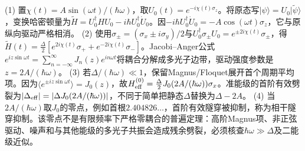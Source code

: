 (1) 置\(\chi(t)=A\sin(\omega t)/(\hbar\omega)\)，取\(U_0(t)=e^{-i\chi(t)\sigma_z}\)。将原态写\(|\psi\rangle=U_0|\widetilde\psi\rangle\)，变换哈密顿量为\(\widetilde H=U_0^\dagger HU_0-i\hbar U_0^\dagger\dot U_0\)。因\(-i\hbar U_0^\dagger\dot U_0=-A\cos(\omega t)\sigma_z\)，它与原纵向驱动严格相消。
(2) 使用\(\sigma_\pm=(\sigma_x\pm i\sigma_y)/2\)与\(U_0^\dagger\sigma_\pm U_0=e^{\pm 2i\chi(t)}\sigma_\pm\)，得\(\widetilde H(t)=\frac\Delta2[e^{2i\chi(t)}\sigma_++e^{-2i\chi(t)}\sigma_-]\)。Jacobi–Anger公式\(e^{iz\sin\omega t}=\sum_{n=-\infty}^\infty J_n(z)e^{in\omega t}\)将耦合分解成多光子边带，驱动强度参数是\(z=2A/(\hbar\omega)\)。
(3) 若\(\Delta/(\hbar\omega)\ll1\)，保留Magnus/Floquet展开首个周期平均项。因为\(\langle e^{\pm iz\sin\omega t}\rangle=J_0(z)\)，故\(H_{\rm eff}^{(0)}=\frac\Delta2J_0(2A/(\hbar\omega))\sigma_x\)。准能级的首阶有效劈裂为\(|\Delta_{\rm eff}|=|\Delta J_0(2A/(\hbar\omega))|\)，不同于简单把静态\(\Delta\)替换为\(\Delta-2A\)。
(4) 当\(2A/(\hbar\omega)\)取\(J_0\)的零点，例如首根\(2.404826\ldots\)，首阶有效隧穿被抑制，称为相干隧穿抑制。该零点不是有限频率下严格零耦合的普遍定理：高阶Magnus项、非正弦驱动、噪声和与其他能级的多光子共振会造成残余劈裂，必须核查\(\hbar\omega\gg\Delta\)及二能级近似。

